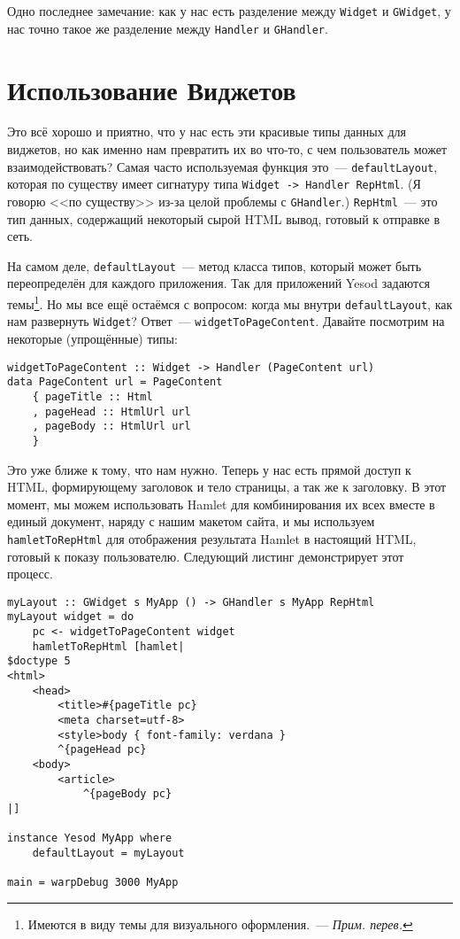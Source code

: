 Одно последнее замечание: как у нас есть разделение между \lstinline'Widget' и
\lstinline'GWidget', у нас точно такое же разделение между \lstinline'Handler'
и \lstinline'GHandler'.

\section{Использование Виджетов}
Это всё хорошо и приятно, что у нас есть эти красивые типы данных для виджетов,
но как именно нам превратить их во что-то, с чем пользователь может
взаимодействовать? Самая часто используемая функция это~---
\lstinline'defaultLayout', которая по существу имеет сигнатуру типа
\lstinline'Widget -> Handler RepHtml'. (Я говорю <<по существу>> из-за целой
проблемы с \lstinline'GHandler'.) \lstinline'RepHtml'~--- это тип данных,
содержащий некоторый сырой HTML вывод, готовый к отправке в сеть.

На самом деле, \lstinline'defaultLayout'~--- метод класса типов, который может
быть переопределён для каждого приложения. Так для приложений Yesod задаются
темы\footnote{Имеются в виду темы для визуального оформления.~--- \emph{Прим.
перев.}}. Но мы все ещё остаёмся с вопросом: когда мы внутри
\lstinline'defaultLayout', как нам развернуть \lstinline'Widget'? Ответ~---
\lstinline'widgetToPageContent'. Давайте посмотрим на некоторые (упрощённые)
типы:
\begin{lstlisting}
widgetToPageContent :: Widget -> Handler (PageContent url)
data PageContent url = PageContent
    { pageTitle :: Html
    , pageHead :: HtmlUrl url
    , pageBody :: HtmlUrl url
    }
\end{lstlisting}

Это уже ближе к тому, что нам нужно. Теперь у нас есть прямой доступ к HTML,
формирующему заголовок и тело страницы, а так же к заголовку. В этот момент, мы
можем использовать Hamlet для комбинирования их всех вместе в единый документ,
наряду с нашим макетом сайта, и мы используем \lstinline'hamletToRepHtml' для
отображения результата Hamlet в настоящий HTML, готовый к показу пользователю.
Следующий листинг демонстрирует этот процесс.
\begin{lstlisting}[caption={Использование \lstinline'widgetToPageContent'}]
myLayout :: GWidget s MyApp () -> GHandler s MyApp RepHtml
myLayout widget = do
    pc <- widgetToPageContent widget
    hamletToRepHtml [hamlet|
$doctype 5
<html>
    <head>
        <title>#{pageTitle pc}
        <meta charset=utf-8>
        <style>body { font-family: verdana }
        ^{pageHead pc}
    <body>
        <article>
            ^{pageBody pc}
|]

instance Yesod MyApp where
    defaultLayout = myLayout

main = warpDebug 3000 MyApp
\end{lstlisting}


